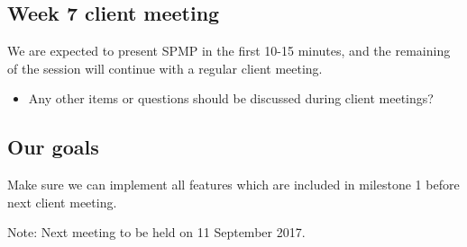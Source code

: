 \documentclass[11pt, a4paper]{article}
\begin{document}
  \subsection{Week 7 client meeting}
We are expected to present SPMP in the first 10-15 minutes, and the remaining of the session will continue with a regular client meeting.
\begin{itemize}
\item 
Any other items or questions should be discussed during client meetings?
  \end{itemize} 
  
  \subsection{Our goals}
  Make sure we can implement all features which are included in milestone 1 before next client meeting. 
  
  
  \vspace*{10pt}
  \noindent Note: Next meeting to be held on 11 September 2017.


  
\end{document}
